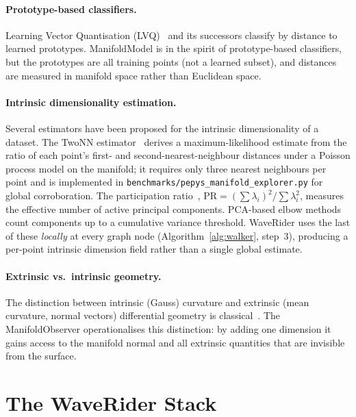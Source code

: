 \documentclass[12pt,letterpaper]{article}
\begin{document}
\paragraph{Prototype-based classifiers.}
Learning Vector Quantisation (LVQ)~\cite{kohonen90} and its successors classify
by distance to learned prototypes.  ManifoldModel is in the spirit of
prototype-based classifiers, but the prototypes are all training points (not a
learned subset), and distances are measured in manifold space rather than
Euclidean space.

\paragraph{Intrinsic dimensionality estimation.}
Several estimators have been proposed for the intrinsic dimensionality of a
dataset.  The TwoNN estimator~\cite{facco17} derives a maximum-likelihood
estimate from the ratio of each point's first- and second-nearest-neighbour
distances under a Poisson process model on the manifold; it requires only three
nearest neighbours per point and is implemented in
\texttt{benchmarks/pepys\_manifold\_explorer.py} for global corroboration.
The participation ratio~\cite{pope21}, $\mathrm{PR} = (\sum\lambda_i)^2 /
\sum\lambda_i^2$, measures the effective number of active principal components.
PCA-based elbow methods~\cite{kambhatla97} count components up to a cumulative
variance threshold.  WaveRider uses the last of these \emph{locally} at every
graph node (Algorithm~\ref{alg:walker}, step~3), producing a per-point intrinsic
dimension field rather than a single global estimate.

\paragraph{Extrinsic vs.\ intrinsic geometry.}
The distinction between intrinsic (Gauss) curvature and extrinsic (mean
curvature, normal vectors) differential geometry is classical~\cite{docarmo76}.
The ManifoldObserver operationalises this distinction: by adding one dimension it
gains access to the manifold normal and all extrinsic quantities that are
invisible from the surface.

\section{The WaveRider Stack}
\end{document}
